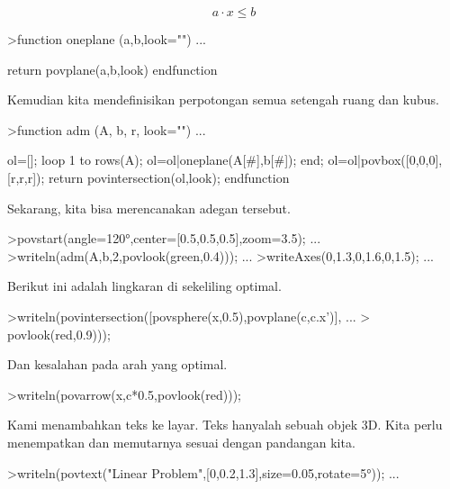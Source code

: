 \documentclass[12pt,arial,letterpaper]{book}
\begin{document}
\begin{eulernootebook}
\begin{eulercomment}
\begin{eulercomment}
\begin{eulernootebook}
\begin{eulercomment}
\begin{eulercomment}
\begin{eulercomment}
\begin{eulercomment}
\begin{eulercomment}
\begin{eulercomment}
\begin{eulercomment}
\begin{eulernotebook}
\begin{eulercomment}
\end{eulercomment}
\begin{eulerformula}
\[
a \cdot x \le b
\]
\end{eulerformula}
\begin{eulerprompt}
>function oneplane (a,b,look="") ...
\end{eulerprompt}
\begin{eulerudf}
    return povplane(a,b,look)
  endfunction
\end{eulerudf}
\begin{eulercomment}
Kemudian kita mendefinisikan perpotongan semua setengah ruang dan
kubus.
\end{eulercomment}
\begin{eulerprompt}
>function adm (A, b, r, look="") ...
\end{eulerprompt}
\begin{eulerudf}
    ol=[];
    loop 1 to rows(A); ol=ol|oneplane(A[#],b[#]); end;
    ol=ol|povbox([0,0,0],[r,r,r]);
    return povintersection(ol,look);
  endfunction
\end{eulerudf}
\begin{eulercomment}
Sekarang, kita bisa merencanakan adegan tersebut.
\end{eulercomment}
\begin{eulerprompt}
>povstart(angle=120°,center=[0.5,0.5,0.5],zoom=3.5); ...
>writeln(adm(A,b,2,povlook(green,0.4))); ...
>writeAxes(0,1.3,0,1.6,0,1.5); ...
\end{eulerprompt}
\begin{eulercomment}
Berikut ini adalah lingkaran di sekeliling optimal.
\end{eulercomment}
\begin{eulerprompt}
>writeln(povintersection([povsphere(x,0.5),povplane(c,c.x')], ...
>  povlook(red,0.9)));
\end{eulerprompt}
\begin{eulercomment}
Dan kesalahan pada arah yang optimal.
\end{eulercomment}
\begin{eulerprompt}
>writeln(povarrow(x,c*0.5,povlook(red)));
\end{eulerprompt}
\begin{eulercomment}
Kami menambahkan teks ke layar. Teks hanyalah sebuah objek 3D. Kita
perlu menempatkan dan memutarnya sesuai dengan pandangan kita.
\end{eulercomment}
\begin{eulerprompt}
>writeln(povtext("Linear Problem",[0,0.2,1.3],size=0.05,rotate=5°)); ...

\end{eulerprompt}
\end{eulernotebook}
\end{eulercomment}
\end{eulercomment}
\end{eulercomment}
\end{eulercomment}
\end{eulercomment}
\end{eulercomment}
\end{eulercomment}
\end{eulernootebook}
\end{eulercomment}
\end{eulercomment}
\end{eulernootebook}
\end{document}
